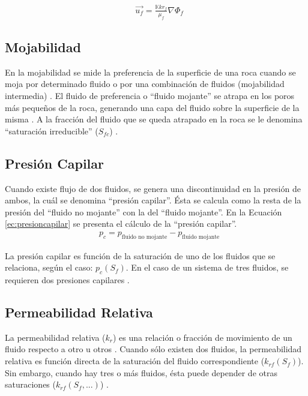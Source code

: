 \begin{align}
\label{ec:DarcyMultifasico} & \vec{u_{f}}=\frac{\mathbb{K}kr_{f}}{\mu_{f} } \nabla{\Phi_{f}}
\end{align}

\subsection{Mojabilidad}\label{subsec:Wettability}
En la mojabilidad se mide la preferencia de la superficie de una roca cuando se moja por determinado fluido o por una combinación de fluidos (mojabilidad intermedia) \citep{chen2007reservoir}. El fluido de preferencia o ``fluido mojante'' se atrapa en los poros más pequeños de la roca, generando una capa del fluido sobre la superficie de la misma \citep{chen2007reservoir}. A la fracción del fluido que se queda atrapado en la roca se le denomina ``saturación irreducible'' ($S_{fc}$) \citep{chen2007reservoir}. \\

\subsection{Presión Capilar}\label{subsec:Capillary}
Cuando existe flujo de dos fluidos, se genera una discontinuidad en la presión de ambos, la cuál se denomina ``presión capilar''. Ésta se calcula como la resta de la presión del ``fluido no mojante'' con la del ``fluido mojante''\citep{chen2007reservoir, FANCHI2002108}. En la Ecuación \ref{ec:presioncapilar} se presenta el cálculo de la ``presión capilar''.
\begin{align}
	\label{ec:presioncapilar}&p_c = p_{\text{fluido no mojante}} - p_{\text{fluido mojante}}
\end{align}

La presión capilar es función de la saturación de uno de los fluidos que se relaciona, según el caso: $p_c(S_{f})$. En el caso de un sistema de tres fluidos, se requieren dos presiones capilares \citep{chen2007reservoir}.

\subsection{Permeabilidad Relativa}\label{subsec:Krs}
La permeabilidad relativa ($k_{r}$) es una relación o fracción de movimiento de un fluido respecto a otro u otros \citep{chen2007reservoir}. Cuando sólo existen dos fluidos, la permeabilidad relativa es función directa de la saturación del fluido correspondiente ($k_{rf}(S_{f})$). Sin embargo, cuando hay tres o más fluidos, ésta puede depender de otras saturaciones ($k_{rf}(S_{f}, ...)$) \citep{chen2007reservoir}.

